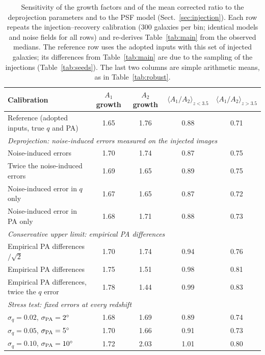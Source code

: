 \documentclass[fleqn,usenatbib]{mnras}
\begin{document}
\begin{table}
\centering
\caption{Sensitivity of the growth factors and of the mean corrected
ratio to the deprojection parameters and to the PSF model
(Sect.~\ref{sec:injection}). Each row repeats the injection--recovery
calibration (300 galaxies per bin; identical models and noise fields for all
rows) and re-derives Table~\ref{tab:main} from the observed medians. The
reference row uses the adopted inputs with this set of injected galaxies;
its differences from Table~\ref{tab:main} are due to the sampling of the
injections (Table~\ref{tab:seeds}). The last two columns are simple
arithmetic means, as in Table~\ref{tab:robust}.}
\label{tab:calsys}
\small
\begin{tabular}{lcccc}
\hline
{Calibration} & {$A_1$ growth} & {$A_2$ growth} &
{$\langle A_1/A_2\rangle_{z<3.5}$} & {$\langle A_1/A_2\rangle_{z>3.5}$}
\\
\hline
Reference (adopted inputs, true $q$ and PA)       & 1.65 & 1.76 & 0.88 & 0.71\\
\multicolumn{5}{l}{\textit{Deprojection: noise-induced errors measured on the injected images}}\\
Noise-induced errors                              & 1.70 & 1.74 & 0.87 & 0.75\\
Twice the noise-induced errors                    & 1.69 & 1.65 & 0.89 & 0.75\\
Noise-induced error in $q$ only                   & 1.67 & 1.65 & 0.87 & 0.72\\
Noise-induced error in PA only                    & 1.68 & 1.71 & 0.88 & 0.73\\
\multicolumn{5}{l}{\textit{Conservative upper limit: empirical PA differences}}\\
Empirical PA differences$/\sqrt2$                 & 1.70 & 1.74 & 0.94 & 0.76\\
Empirical PA differences                          & 1.75 & 1.51 & 0.98 & 0.81\\
Empirical PA differences, twice the $q$ error     & 1.78 & 1.44 & 0.99 & 0.83\\
\multicolumn{5}{l}{\textit{Stress test: fixed errors at every redshift}}\\
$\sigma_q=0.02$, $\sigma_{\rm PA}=2^\circ$         & 1.68 & 1.69 & 0.89 & 0.74\\
$\sigma_q=0.05$, $\sigma_{\rm PA}=5^\circ$         & 1.70 & 1.66 & 0.91 & 0.73\\
$\sigma_q=0.10$, $\sigma_{\rm PA}=10^\circ$        & 1.72 & 2.03 & 1.01 & 0.80\\

\end{tabular}
\end{table}
\end{document}
